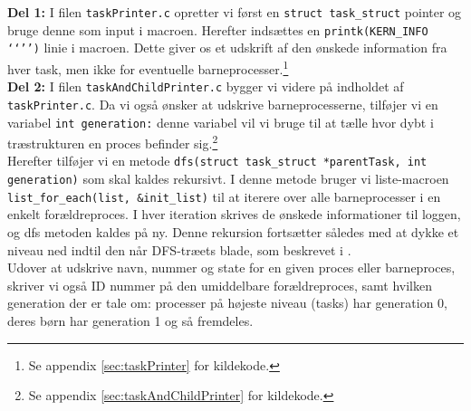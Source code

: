 \documentclass[main.tex]{subfile}
\begin{document}
\textbf{Del 1:} I filen \texttt{taskPrinter.c} opretter vi først en \texttt{struct task\_struct} pointer og bruge denne som input i macroen. Herefter indsættes en \texttt{printk(KERN\_INFO ‘‘’’)} linie i macroen. Dette giver os et udskrift af den ønskede information fra hver task, men ikke for eventuelle barneprocesser.\footnote{Se appendix \ref{sec:taskPrinter} for kildekode.}\\

\textbf{Del 2:} I filen \texttt{taskAndChildPrinter.c} bygger vi videre på indholdet af \texttt{taskPrinter.c}. Da vi også ønsker at udskrive barneprocesserne, tilføjer vi en variabel \texttt{int generation:} denne variabel vil vi bruge til at tælle hvor dybt i træstrukturen en proces befinder sig.\footnote{Se appendix \ref{sec:taskAndChildPrinter} for kildekode.}\\

Herefter tilføjer vi en metode \texttt{dfs(struct task\_struct *parentTask, int generation)} som skal kaldes rekursivt. I denne metode bruger vi liste-macroen \texttt{list\_for\_each(list, \&init\_list)} til at iterere over alle barneprocesser i en enkelt forældreproces. I hver iteration skrives de ønskede informationer til loggen, og dfs metoden kaldes på ny. Denne rekursion fortsætter således med at dykke et niveau ned indtil den når DFS-træets blade, som beskrevet i \cite[s.157, s.114]{SA:2013}.\\

Udover at udskrive navn, nummer og state for en given proces eller barneproces, skriver vi også ID nummer på den umiddelbare forældreproces, samt hvilken generation der er tale om: processer på højeste niveau (tasks) har generation 0, deres børn har generation 1 og så fremdeles.
\end{document}
